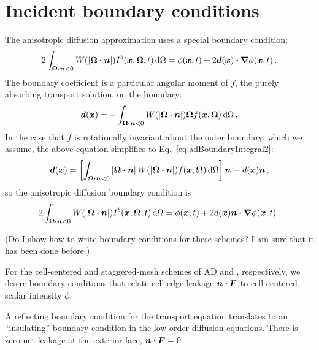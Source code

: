 \section{Incident boundary conditions} \label{sec:discreteBc}

The anisotropic diffusion approximation uses a special boundary condition:
\begin{equation} \tagref{eq:loBc}
2\int_{\vec{\Omega}\vd\vec{n} < 0} W(\abs{\vec{\Omega}\vd\vec{n}})
I^b(\vec{x},\vec{\Omega},t) \ud\Omega
=
\phi(\vec{x},t)
+ 2 \vec{d}(\vec{x}) \vd \grad \phi(\vec{x},t)\,.
\end{equation}
The boundary coefficient is a particular angular moment of $f$, the purely
absorbing transport solution, on the boundary:
\begin{equation}\tagref{eq:adBoundaryIntegral}
  \vec{d}(\vec{x}) = -\int_{\vec{\Omega}\vd\vec{n} < 0} W(\abs{\vec{\Omega}\vd\vec{n}})
\vec{\Omega} f(\vec{x}, \vec{\Omega}) \ud\Omega\,,
\end{equation}
In the case that $f$ is rotationally invariant about the outer boundary, which
we assume, the above equation simplifies to Eq.~\eqref{eq:adBoundaryIntegral2}:
\begin{equation*}
  \bm{d}(\bm{x})
  = \left[ \int_{\bm{\Omega}\bm{\cdot}\bm{n} < 0}
  \left| \bm{\Omega}\bm{\cdot}\bm{n} \right| W(\left| \bm{\Omega}\bm{\cdot}\bm{n} \right|)
  f(\bm{x}, \bm{\Omega}) \mathop{}\!\mathrm{d}\Omega\right] \bm{n}
  \equiv d(\bm{x}) \bm{n}\,,
\end{equation*}
so the anisotropic diffusion boundary condition is
\begin{equation*}
2\int_{\bm{\Omega}\bm{\cdot}\bm{n} < 0} W(\left| \bm{\Omega}\bm{\cdot}\bm{n} \right|)
I^b(\bm{x},\bm{\Omega},t) \mathop{}\!\mathrm{d}\Omega
=
\phi(\bm{x},t)
+ 2 d(\bm{x}) \bm{n} \bm{\cdot} \bm{\nabla} \phi(\bm{x},t)\,.
\end{equation*}

(Do I show how to write boundary conditions for these schemes? I am sure that it
has been done before.)

For the cell-centered and staggered-mesh schemes of AD and \APone, respectively,
we desire boundary conditions that relate cell-edge leakage $\bm{n}\bm{\cdot}\bm{F}$
to cell-centered scalar intensity $\phi$.

A reflecting boundary condition for the transport equation translates to an
``insulating'' boundary condition in the low-order diffusion equations. There
is zero net leakage at the exterior face, $\bm{n}\bm{\cdot}\bm{F}=0$.

